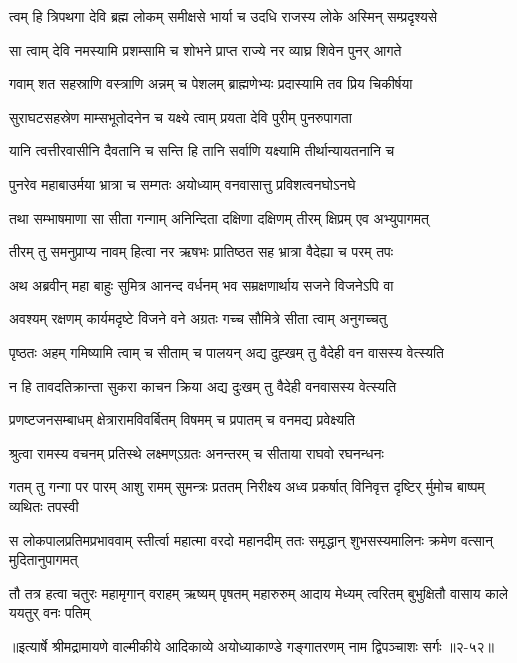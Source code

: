 \twolineshloka
{त्वम् हि त्रिपथगा देवि ब्रह्म लोकम् समीक्षसे}
{भार्या च उदधि राजस्य लोके अस्मिन् सम्प्रदृश्यसे} %

\twolineshloka
{सा त्वाम् देवि नमस्यामि प्रशम्सामि च शोभने}
{प्राप्त राज्ये नर व्याघ्र शिवेन पुनर् आगते} %

\twolineshloka
{गवाम् शत सहस्राणि वस्त्राणि अन्नम् च पेशलम्}
{ब्राह्मणेभ्यः प्रदास्यामि तव प्रिय चिकीर्षया} %

\twolineshloka
{सुराघटसहस्रेण माम्सभूतोदनेन च}
{यक्ष्ये त्वाम् प्रयता देवि पुरीम् पुनरुपागता} %

\twolineshloka
{यानि त्वत्तीरवासीनि दैवतानि च सन्ति हि}
{तानि सर्वाणि यक्ष्यामि तीर्थान्यायतनानि च} %

\twolineshloka
{पुनरेव महाबाउर्मया भ्रात्रा च सम्गतः}
{अयोध्याम् वनवासात्तु प्रविशत्वनघोऽनघे} %

\twolineshloka
{तथा सम्भाषमाणा सा सीता गन्गाम् अनिन्दिता}
{दक्षिणा दक्षिणम् तीरम् क्षिप्रम् एव अभ्युपागमत्} %

\twolineshloka
{तीरम् तु समनुप्राप्य नावम् हित्वा नर ऋषभः}
{प्रातिष्ठत सह भ्रात्रा वैदेह्या च परम् तपः} %

\twolineshloka
{अथ अब्रवीन् महा बाहुः सुमित्र आनन्द वर्धनम्}
{भव सम्रक्षणार्थाय सजने विजनेऽपि वा} %

\twolineshloka
{अवश्यम् रक्षणम् कार्यमदृष्टे विजने वने}
{अग्रतः गच्च सौमित्रे सीता त्वाम् अनुगच्चतु} %

\twolineshloka
{पृष्ठतः अहम् गमिष्यामि त्वाम् च सीताम् च पालयन्}
{अद्य दुह्खम् तु वैदेही वन वासस्य वेत्स्यति} %

\twolineshloka
{न हि तावदतिक्रान्ता सुकरा काचन क्रिया}
{अद्य दुःखम् तु वैदेही वनवासस्य वेत्स्यति} %

\twolineshloka
{प्रणष्टजनसम्बाधम् क्षेत्रारामविवर्बितम्}
{विषमम् च प्रपातम् च वनमद्य प्रवेक्ष्यति} %

\twolineshloka
{श्रुत्वा रामस्य वचनम् प्रतिस्थे लक्ष्मण्ऽग्रतः}
{अनन्तरम् च सीताया राघवो रघनन्धनः} %

\fourlineindentedshloka
{गतम् तु गन्गा पर पारम् आशु}
{रामम् सुमन्त्रः प्रततम् निरीक्ष्य}
{अध्व प्रकर्षात् विनिवृत्त दृष्टिर्}
{र्मुमोच बाष्पम् व्यथितः तपस्वी} %

\fourlineindentedshloka
{स लोकपालप्रतिमप्रभाववाम्}
{स्तीर्त्वा महात्मा वरदो महानदीम्}
{ततः समृद्धान् शुभसस्यमालिनः}
{क्रमेण वत्सान् मुदितानुपागमत्} %

\fourlineindentedshloka
{तौ तत्र हत्वा चतुरः महामृगान्}
{वराहम् ऋष्यम् पृषतम् महारुरुम्}
{आदाय मेध्यम् त्वरितम् बुभुक्षितौ}
{वासाय काले ययतुर् वनः पतिम्} %


॥इत्यार्षे श्रीमद्रामायणे वाल्मीकीये आदिकाव्ये अयोध्याकाण्डे गङ्गातरणम् नाम द्विपञ्चाशः सर्गः ॥२-५२॥
